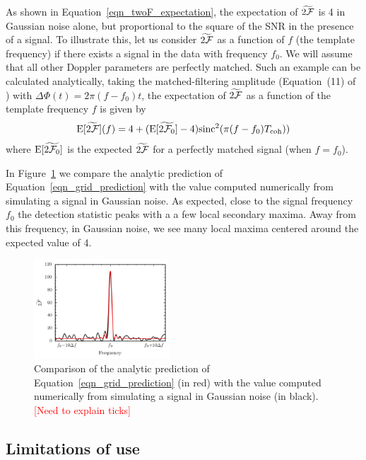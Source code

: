 \documentclass[aps, prd, twocolumn, superscriptaddress, floatfix, showpacs, nofootinbib, longbibliography]{revtex4-1}
\newcommand{\comment}[1]{\textcolor{red}{[#1]}}
\begin{document}
As shown in Equation~\eqref{eqn_twoF_expectation}, the expectation of
$\widetilde{2{\mathcal{F}}}$ is 4 in Gaussian noise alone, but proportional to the square
of the SNR in the presence of a signal.  To illustrate this, let us consider
$\widetilde{2{\mathcal{F}}}$ as a function of $f$ (the template frequency) if there exists
a signal in the data with frequency $f_0$. We will assume that all other
Doppler parameters are perfectly matched.  Such an example can be calculated
analytically, taking the matched-filtering amplitude (Equation~(11) of
\citep{prix2005}) with $\Delta\Phi(t) = 2\pi(f - f_0) t$, the expectation of
$\widetilde{2{\mathcal{F}}}$ as a function of the template frequency $f$ is given by
\begin{equation}
\textrm{E}[\widetilde{2{\mathcal{F}}}](f) = 4 + 
(\textrm{E}[\widetilde{2{\mathcal{F}}_0}] -4)\textrm{sinc}^{2}(\pi(f-f_0)T_{\rm coh}))
\label{eqn_grid_prediction}
\end{equation}
where $\textrm{E}[\widetilde{2{\mathcal{F}}_0}]$ is the expected $\widetilde{2{\mathcal{F}}}$ for
a perfectly matched signal (when $f=f_0$).

In Figure~\ref{fig_grid_frequency} we compare the analytic prediction of
Equation~\eqref{eqn_grid_prediction} with the value computed numerically
from simulating a signal in Gaussian noise. As expected, close to the signal
frequency $f_0$ the detection statistic peaks with a a few local secondary
maxima. Away from this frequency, in Gaussian noise, we see many local maxima
centered around the expected value of 4.
\begin{figure}[htb]
\centering \includegraphics[width=0.45\textwidth]{grided_frequency_search_1D}
\caption{Comparison of the analytic prediction of
Equation~\eqref{eqn_grid_prediction} (in red) with the value computed
numerically from simulating a signal in Gaussian noise (in black).
\comment{Need to explain ticks}}
\label{fig_grid_frequency}
\end{figure}

\subsection{Limitations of use}
\end{document}

